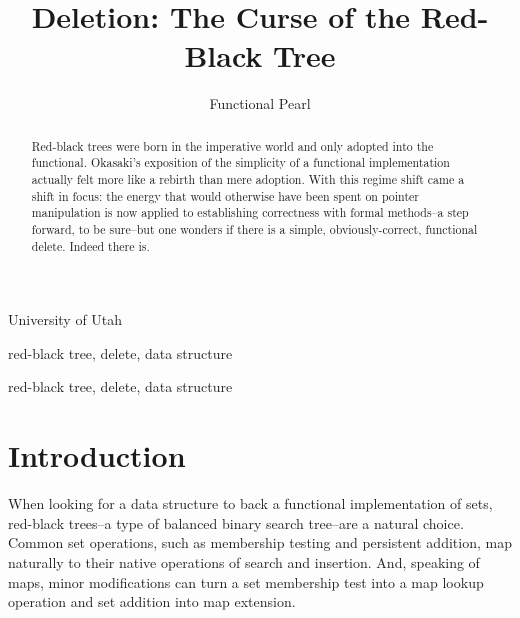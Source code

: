 \documentclass[preprint]{sigplanconf}
\begin{document}
\copyrightdata{[to be supplied]} 


\title{Deletion: The Curse of the Red-Black Tree}
\subtitle{Functional Pearl}

           {University of Utah}

\maketitle

\begin{abstract}
Red-black trees were born in the imperative world and only adopted into the functional. Okasaki's exposition of the simplicity of a functional implementation actually felt more like a rebirth than mere adoption. With this regime shift came a shift in focus: the energy that would otherwise have been spent on pointer manipulation is now applied to establishing correctness with formal methods--a step forward, to be sure--but one wonders if there is a simple, obviously-correct, functional delete. Indeed there is.
\end{abstract}


\terms
red-black tree, delete, data structure

\keywords
red-black tree, delete, data structure

\section{Introduction}

When looking for a data structure to back a functional implementation of sets, red-black trees--a type of balanced binary search tree--are a natural choice. Common set operations, such as membership testing and persistent addition, map naturally to their native operations of search and insertion. And, speaking of maps, minor modifications can turn a set membership test into a map lookup operation and set addition into map extension.
\end{document}
